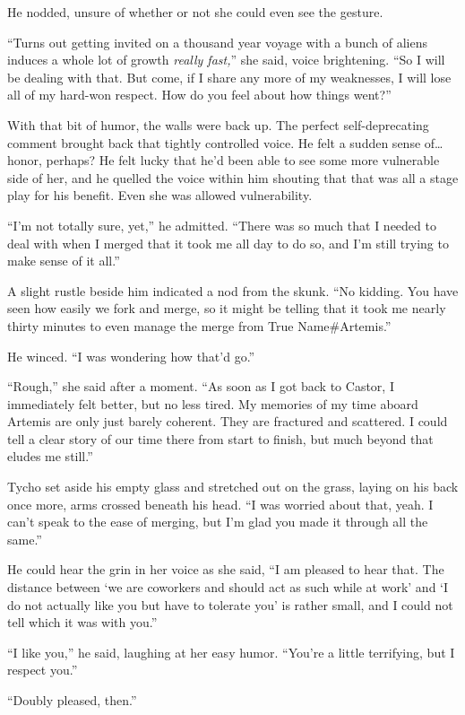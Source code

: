 He nodded, unsure of whether or not she could even see the gesture.

``Turns out getting invited on a thousand year voyage with a bunch of aliens induces a whole lot of growth \emph{really fast,}'' she said, voice brightening. ``So I will be dealing with that. But come, if I share any more of my weaknesses, I will lose all of my hard-won respect. How do you feel about how things went?''

With that bit of humor, the walls were back up. The perfect self-deprecating comment brought back that tightly controlled voice. He felt a sudden sense of\ldots honor, perhaps? He felt lucky that he'd been able to see some more vulnerable side of her, and he quelled the voice within him shouting that that was all a stage play for his benefit. Even she was allowed vulnerability.

``I'm not totally sure, yet,'' he admitted. ``There was so much that I needed to deal with when I merged that it took me all day to do so, and I'm still trying to make sense of it all.''

A slight rustle beside him indicated a nod from the skunk. ``No kidding. You have seen how easily we fork and merge, so it might be telling that it took me nearly thirty minutes to even manage the merge from True Name\#Artemis.''

He winced. ``I was wondering how that'd go.''

``Rough,'' she said after a moment. ``As soon as I got back to Castor, I immediately felt better, but no less tired. My memories of my time aboard Artemis are only just barely coherent. They are fractured and scattered. I could tell a clear story of our time there from start to finish, but much beyond that eludes me still.''

Tycho set aside his empty glass and stretched out on the grass, laying on his back once more, arms crossed beneath his head. ``I was worried about that, yeah. I can't speak to the ease of merging, but I'm glad you made it through all the same.''

He could hear the grin in her voice as she said, ``I am pleased to hear that. The distance between `we are coworkers and should act as such while at work' and `I do not actually like you but have to tolerate you' is rather small, and I could not tell which it was with you.''

``I like you,'' he said, laughing at her easy humor. ``You're a little terrifying, but I respect you.''

``Doubly pleased, then.''

